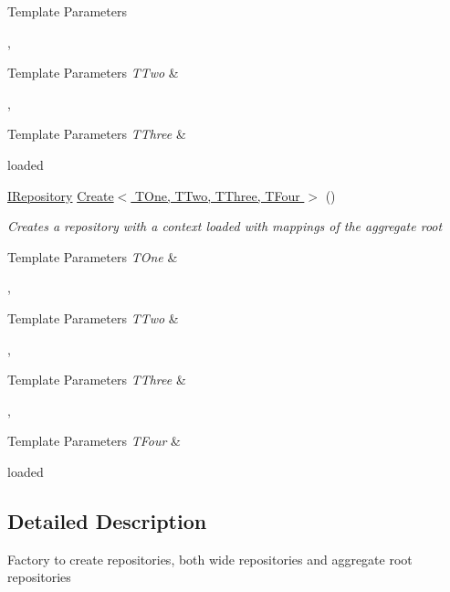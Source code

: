\begin{DoxyCompactItemize}
\begin{DoxyCompactList}
\begin{DoxyTemplParams}{Template Parameters}
\hline
\end{DoxyTemplParams}
,
\begin{DoxyTemplParams}{Template Parameters}
{\em T\-Two} & \\
\hline
\end{DoxyTemplParams}
,
\begin{DoxyTemplParams}{Template Parameters}
{\em T\-Three} & \\
\hline
\end{DoxyTemplParams}
loaded \end{DoxyCompactList}\item 
\hyperlink{interface_highway_1_1_data_1_1_interfaces_1_1_i_repository}{I\-Repository} \hyperlink{interface_highway_1_1_data_1_1_interfaces_1_1_i_repository_factory_a41cfb8f0c6ee57071f92df68c7f5a7b9}{Create$<$ T\-One, T\-Two, T\-Three, T\-Four $>$} ()
\begin{DoxyCompactList}\small\item\em Creates a repository with a context loaded with mappings of the aggregate root 
\begin{DoxyTemplParams}{Template Parameters}
{\em T\-One} & \\
\hline
\end{DoxyTemplParams}
,
\begin{DoxyTemplParams}{Template Parameters}
{\em T\-Two} & \\
\hline
\end{DoxyTemplParams}
,
\begin{DoxyTemplParams}{Template Parameters}
{\em T\-Three} & \\
\hline
\end{DoxyTemplParams}
,
\begin{DoxyTemplParams}{Template Parameters}
{\em T\-Four} & \\
\hline
\end{DoxyTemplParams}
loaded \end{DoxyCompactList}\end{DoxyCompactItemize}


\subsection{Detailed Description}
Factory to create repositories, both wide repositories and aggregate root repositories 



